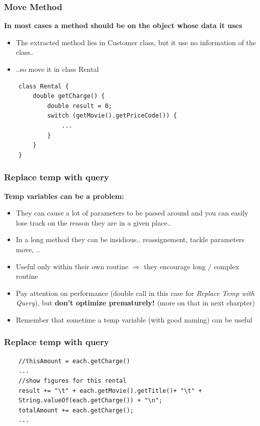 \documentclass{beamer}
\begin{document}
\begin{frame}[containsverbatim]
  \frametitle{Move Method}
  \textbf{In most cases a method should be on the object whose data it uses}
   \begin{itemize}
  		\item The extracted method lies in Customer class, but it use no information of the class..
		\item ..so move it in class Rental
  \end{itemize}
  \begin{lstlisting}
	class Rental {
		double getCharge() {
			double result = 0;
			switch (getMovie().getPriceCode()) {
				...
			}
		}
	}
	\end{lstlisting}
\end{frame}

\begin{frame}[containsverbatim]
  \frametitle{Replace temp with query}
  \textbf{Temp variables can be a problem:}
   \begin{itemize}
  		\item They can cause a lot of parameters to be passed around and you can easily lose track on the reason they are in a given place..
		\item In a long method they can be insidious.. reassignement, tackle parameters move, ..
		\item Useful only within their own routine $\Rightarrow$  they encourage long / complex routine
		\item Pay attention on performance (double call in this case for \textit{Replace Temp 
with Query}), but \textbf{don't optimize prematurely!} (more on that in next charpter)
		\item Remember that sometime a temp variable (with good naming) can be useful
  \end{itemize}
\end{frame}

\begin{frame}[containsverbatim]
  \frametitle{Replace temp with query}
  \begin{lstlisting}
  	//thisAmount = each.getCharge()
	...
	//show figures for this rental
	result += "\t" + each.getMovie().getTitle()+ "\t" +
	String.valueOf(each.getCharge()) + "\n";
	totalAmount += each.getCharge();
	...
	\end{lstlisting}
\end{frame}
\end{document}
